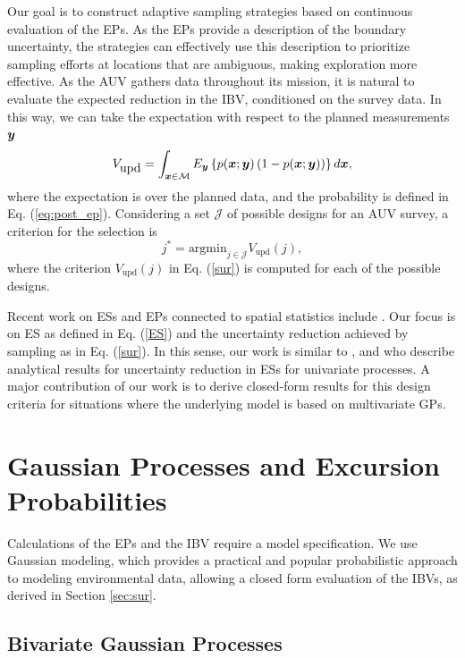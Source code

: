 \documentclass[aoas]{imsart}
\begin{document}
Our goal is to construct adaptive sampling strategies based on continuous evaluation of the EPs. As the EPs provide a description of the boundary uncertainty, the strategies can effectively use this description to prioritize sampling efforts at locations that are ambiguous, making exploration more effective. As the AUV gathers data throughout its mission, it is natural to evaluate the expected reduction in the IBV, conditioned on the survey data. In this way, we can
take the expectation with respect to the planned measurements ${\boldsymbol y}$
\begin{equation}\label{sur}
    V_{\mbox{upd}} = \int_{\bx \in \mathcal{M}} E_{\by} \left\{ p(\bx;\by)\left( 1-p(\bx;\by)\right) \right\} d\bx, 
\end{equation}
where the expectation is over the planned data, and the probability is defined in Eq. (\ref{eq:post_ep}).
Considering a set $\mathcal{J}$ of possible designs for an AUV survey, a criterion for the selection is
\begin{equation}\label{crit}
    j^* = \mbox{argmin}_{j \in \mathcal{J}} V_{\mbox{upd}}(j),
\end{equation}
where the criterion $V_{\mbox{upd}}(j)$ in Eq. (\ref{sur}) is computed
for each of the possible designs. 

Recent work on ESs and EPs connected to spatial statistics include
\cite{picheny2010,french2013spatio,bolin2015excursion,french2016credible}.
Our focus is on ES as defined in Eq. (\ref{ES}) and the uncertainty
reduction achieved by sampling as in Eq. (\ref{sur}). In this sense,
our work is similar to \cite{bect2012}, \cite{chevalier2014fast} and
\cite{azzimonti2016quantifying} who describe analytical results for
uncertainty reduction in ESs for univariate processes. A major
contribution of our work is to derive closed-form results for this
design criteria for situations where the underlying model is based on multivariate GPs.

\section{Gaussian Processes and Excursion Probabilities}
\label{sec:GP_EP}

Calculations of the EPs and the IBV require a model specification. We use Gaussian modeling, which provides a practical and popular probabilistic approach to modeling environmental data, allowing a closed form
evaluation of the IBVs, as derived in Section \ref{sec:sur}.

\subsection{Bivariate Gaussian Processes}
\end{document}
